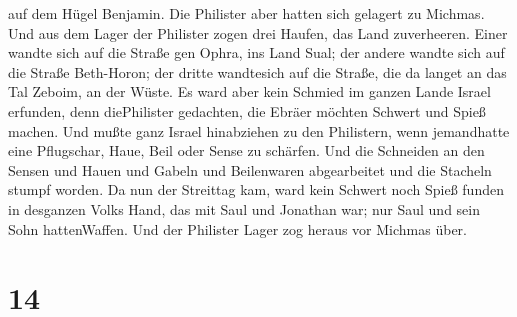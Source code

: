 auf dem Hügel Benjamin. Die Philister aber hatten sich gelagert zu
Michmas.  Und aus dem Lager der Philister zogen drei
Haufen, das Land zuverheeren. Einer wandte sich auf die Straße gen
Ophra, ins Land Sual;  der andere wandte sich auf die
Straße Beth-Horon; der dritte wandtesich auf die Straße, die da langet
an das Tal Zeboim, an der Wüste.  Es ward aber kein Schmied
im ganzen Lande Israel erfunden, denn diePhilister gedachten, die Ebräer
möchten Schwert und Spieß machen.  Und mußte ganz Israel
hinabziehen zu den Philistern, wenn jemandhatte eine Pflugschar, Haue,
Beil oder Sense zu schärfen.  Und die Schneiden an den
Sensen und Hauen und Gabeln und Beilenwaren abgearbeitet und die
Stacheln stumpf worden.  Da nun der Streittag kam, ward
kein Schwert noch Spieß funden in desganzen Volks Hand, das mit Saul und
Jonathan war; nur Saul und sein Sohn hattenWaffen.  Und der
Philister Lager zog heraus vor Michmas über.

\hypertarget{section-13}{%
\section{14}\label{section-13}}

